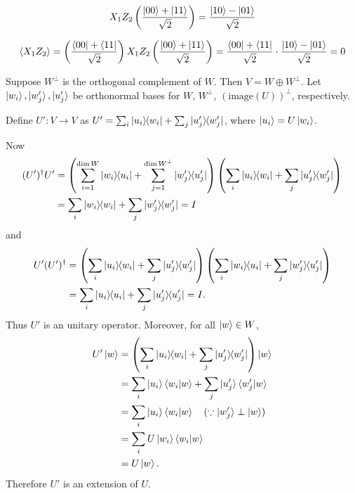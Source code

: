 \begin{align*}
     X_1 Z_2 \left(\frac{\ket{00} + \ket{11}}{\sqrt{2}} \right) = \frac{\ket{10} - \ket{01}}{\sqrt{2}}
\end{align*}


\begin{align*}
     \braket{X_1 Z_2} = \left(\frac{\bra{00} + \bra{11}}{\sqrt{2}} \right) X_1 Z_2 \left(\frac{\ket{00} + \ket{11}}{\sqrt{2}} \right)
    = \frac{\bra{00} + \bra{11}}{\sqrt{2}}  \cdot \frac{\ket{10} - \ket{01}}{\sqrt{2}}
    = 0
\end{align*}




Suppose $W^\perp$ is the orthogonal complement of $W$. Then $V = W \oplus W^\perp$.
Let $\ket{w_i},\ket{w_j'},\ket{u_j'}$ be orthonormal bases for $W$, $W^\perp$, $\left( \mathrm{image}(U) \right)^\perp$, respectively.

Define $U': V \rightarrow V$ as $U' = \sum_i \ket{u_i}\hspace{-1mm} \bra{w_i} + \sum_j \ket{u_j'}\hspace{-1mm} \bra{w_j'}$,
where $\ket{u_i} = U \ket{w_i}$.


Now
\begin{align*}
    (U')^\dagger U' &= \left( \sum_{i = 1}^{\dim W} \ket{w_i}\hspace{-1mm} \bra{u_i} + \sum_{j = 1}^{\dim W^\perp} \ket{w_j'}\hspace{-1mm} \bra{u_j'} \right)  \left( \sum_i \ket{u_i}\hspace{-1mm} \bra{w_i} + \sum_j \ket{u_j'}\hspace{-1mm} \bra{w_j'} \right)\\
                    &= \sum_i \ket{w_i}\hspace{-1mm} \bra{w_i} + \sum_j \ket{w_j'}\hspace{-1mm} \bra{w_j'} = I
\end{align*}
%
and
%
\begin{align*}
    U' (U')^\dagger &= \left( \sum_i \ket{u_i}\hspace{-1mm} \bra{w_i} + \sum_j \ket{u_j'}\hspace{-1mm} \bra{w_j'} \right) \left( \sum_i \ket{w_i}\hspace{-1mm} \bra{u_i} + \sum_j \ket{w_j'}\hspace{-1mm} \bra{u_j'} \right)\\
                    &= \sum_i \ket{u_i}\hspace{-1mm} \bra{u_i} + \sum_j \ket{u_j'}\hspace{-1mm} \bra{u_j'} = I.
\end{align*}
%
Thus $U'$ is an unitary operator.
Moreover, for all $\ket{w} \in W$,
\begin{align*}
    U' \ket{w} &= \left( \sum_i \ket{u_i}\hspace{-1mm} \bra{w_i} + \sum_j \ket{u_j'}\hspace{-1mm} \bra{w_j'} \right) \ket{w}\\
               &= \sum_i \ket{u_i} \braket{w_i | w} + \sum_j \ket{u_j'} \braket{w_j' | w}\\
			   &= \sum_i \ket{u_i} \braket{w_i | w}  ~~~(\because \ket{w_j'} \perp \ket{w})\\
			   &= \sum_i U \ket{w_i} \braket{w_i | w}\\
			   &= U \ket{w}.
\end{align*}
%
Therefore $U'$ is an extension of $U$.


